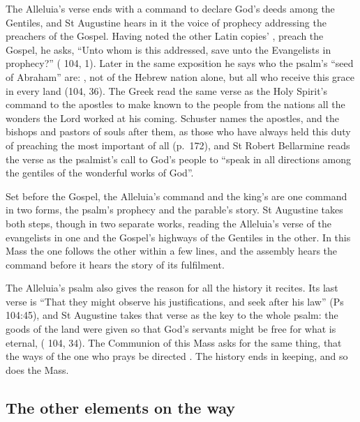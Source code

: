 The Alleluia's verse ends with a command to declare God's deeds among the
Gentiles, and St Augustine hears in it the voice of prophecy addressing the
preachers of the Gospel. Having noted the other Latin copies'
, preach the Gospel, he asks, ``Unto whom is this
addressed, save unto the Evangelists in prophecy?''
( 104, 1). Later in the same exposition he says who the
psalm's ``seed of Abraham'' are: , not of the Hebrew nation
alone, but all who receive this grace in every land (104, 36). The Greek
 read the same verse as the Holy Spirit's command to the
apostles to make known to the people from the nations all the wonders the
Lord worked at his coming. Schuster names the apostles, and the bishops and
pastors of souls after them, as those who have always held this duty of
preaching the most important of all (p.~172), and St Robert Bellarmine reads the
verse as the psalmist's call to God's people to ``speak in all directions among
the gentiles of the wonderful works of God''.

Set before the Gospel, the Alleluia's command and the king's  are one command in two forms, the psalm's prophecy and the
parable's story. St Augustine takes both steps, though in two separate works, reading the
Alleluia's verse of the evangelists in one and the Gospel's highways of the
Gentiles in the other. In this Mass the one follows the
other within a few lines, and the assembly hears the command before it hears
the story of its fulfilment.

The Alleluia's psalm also gives the reason for all the history it recites. Its
last verse is ``That they might observe his justifications, and seek after his
law'' (Ps 104:45), and St Augustine takes that verse as the key to the whole
psalm: the goods of the land were given so that God's servants might be free
for what is eternal, 
( 104, 34). The Communion of this Mass asks for the same
thing, that the ways of the one who prays be directed . The history ends in keeping, and so does the Mass.

\subsection{The other elements on the way}

